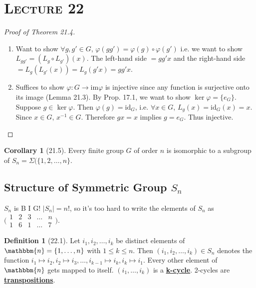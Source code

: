 \documentclass{article}
\newcommand{\id}{\mathrm{id}}
\newcommand{\inverse}[1]{#1^{-1}}
\newcommand{\define}[1]{\textbf{\underline{#1}}}
\newcommand{\func}[3]{#1: #2 \to #3}
\theoremstyle{definition}
\newtheorem*{defn}{Definition}
\newtheorem*{cor}{Corollary}
\theoremstyle{remark}
\newcommand{\im}{\mathrm{im}}
\begin{document}
    \section*{\textbf{\textsc{Lecture 22}}}{
        \begin{proof}[Proof of Theorem 21.4]
            \begin{enumerate}
                \item Want to show $\forall g,g'\in G$, $\varphi(gg')=\varphi(g)\circ\varphi(g')$ i.e. we want to show $L_{gg'}=(L_g\circ L_{g'})(x)$. The left-hand side $=gg'x$ and the right-hand side $=L_g(L_{g'}(x))=L_g(g'x)=gg'x$.
                \item Suffices to show $\func{\varphi}{G}{\im\varphi}$ is injective since any function is surjective onto its image (Lemma 21.3). By Prop. 17.1, we want to show $\ker\varphi=\{e_G\}$. Suppose $g\in \ker\varphi$. Then $\varphi(g)=\id_G$, i.e. $\forall x\in G$, $L_g(x)=\id_G(x)=x$. Since $x\in G$, $\inverse{x} \in G$. Therefore $gx=x$ implies $g=e_G$. Thus injective.
            \end{enumerate}
        \end{proof}
        
        \begin{cor}[21.5]
            Every finite group $G$ of order $n$ is isomorphic to a subgroup of $S_n=\Sigma(\{1,2,\ldots,n\}$.
        \end{cor}
        
        \subsection*{Structure of Symmetric Group $S_n$}{
            \noindent $S_n$ is B I G! $|S_n|=n!$, so it's too hard to write the elements of $S_n$ as $\big(\begin{smallmatrix} 1&2&3&\ldots&n\\ 1&6&1&\ldots&7 \end{smallmatrix}\big)$.
            
            \begin{defn}[22.1]
                Let $i_1,i_2,\ldots,i_k$ be distinct elements of $\mathbbm{n}=\{1,\ldots,n\}$ with $1\leq k\leq n$. Then $(i_1,i_2,\ldots, i_k)\in S_n$ denotes the function $i_1 \mapsto i_2,i_2\mapsto i_3,\ldots, i_{k-1}\mapsto i_k, i_k \mapsto i_1$. Every other element of $\mathbbm{n}$ gets mapped to itself. $(i_1,\ldots, i_k)$ is a \define{k-cycle}. 2-cycles are \define{transpositions}.
            \end{defn}
            
}}
\end{document}
